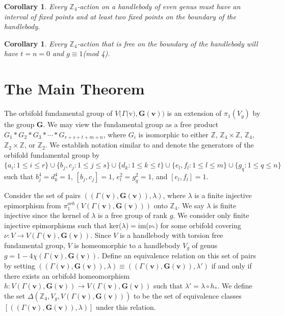 \documentclass{amsart}
\newtheorem{corollary}[theorem]{Corollary}
\theoremstyle{definition}
\numberwithin{equation}{section}
\begin{document}
\begin{corollary}
Every $\mathbb{Z}_4$-action on a handlebody of even genus must have an interval of fixed points and at least two fixed points on the boundary of the handlebody.
\end{corollary}

\begin{corollary}
Every $\mathbb{Z}_4$-action that is free on the boundary of the handlebody will have $t=n=0$ and $g\equiv1$(mod 4).
\end{corollary}

\section{\bf The Main Theorem}

The orbifold fundamental group of $V(\Gamma($v$), {\mathbf{G(v)}})$ is an extension of $\pi_1(V_g)$ by the group $\mathbf{G}$. We may view the fundamental group  as a free product $G_1*G_2*G_3*\cdots*{G_{r+s+t+m+n}}$, where $G_i$ is isomorphic to either $\mathbb{Z}$, $\mathbb{Z}_{4}\times\mathbb{Z}$, $\mathbb{Z}_{4}$, $\mathbb{Z}_2\times\mathbb{Z}$, or $\mathbb{Z}_2$. We establish notation similar to \cite{KM} and denote the generators of the orbifold fundamental group by $\{a_i: 1\leq{i}\leq{r}\}\cup\{b_j,c_j:1\leq{j}\leq{s}\}\cup\{d_k:1\leq{k}\leq{t}\}\cup\{e_l,f_l:1\leq{l}\leq{m}\}\cup\{g_q:1\leq{q}\leq{n}\}$ such that $b_j^{4}=d_k^{4}=1$, $[b_j,c_j]=1$, $e_l^2=g_q^2=1$, and $[e_l,f_l]=1$. 

Consider the set of pairs $((\Gamma({\mathbf{v}}),{\mathbf{G(v)}}),\lambda)$, where $\lambda$ is a finite injective epimorphism from $\pi_1^{orb}(V(\Gamma({\mathbf{v}}),{\mathbf{G(v)}}))$ onto $\mathbb{Z}_{4}$. We say $\lambda$ is finite injective since the kernel of $\lambda$ is a free group of rank $g$. We consider only finite injective epimorphisms such that ker($\lambda$)$=$im($\nu_*$) for some orbifold covering $\nu:V\longrightarrow V(\Gamma({\mathbf{v}}),{\mathbf{G(v)}})$. Since $V$ is a handlebody with torsion free fundamental group, $V$ is homeomorphic to a handlebody $V_g$ of genus $g=1-4\chi(\Gamma({\mathbf{v}}),{\mathbf{G(v)}})$. Define an equivalence relation on this set of pairs by setting $((\Gamma({\mathbf{v}}),{\mathbf{G(v)}}),\lambda)\equiv(({\Gamma}({\mathbf{v}}),{\mathbf{G(v)}}),\lambda')$ if and only if there exists an orbifold homeomorphism $h:V(\Gamma({\mathbf{v}}),{\mathbf{G(v)}})\longrightarrow{V(\Gamma({\mathbf{v}}),{\mathbf{G(v)}})}$ such that $\lambda'=\lambda\circ{h_*}$. We define the set $\Delta(\mathbb{Z}_{4},V_g,V(\Gamma({\mathbf{v}}),{\mathbf{G(v)}}))$ to be the set of equivalence classes $[((\Gamma({\mathbf{v}}),{\mathbf{G(v)}}),\lambda)]$ under this relation.
\end{document}
